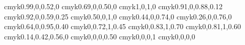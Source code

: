 	\definecolor{JungleGreen}   {cmyk}{0.99,0,0.52,0}
	\definecolor{SeaGreen}      {cmyk}{0.69,0,0.50,0}
	\definecolor{Green}         {cmyk}{1,0,1,0}
	\definecolor{ForestGreen}   {cmyk}{0.91,0,0.88,0.12}
	\definecolor{PineGreen}     {cmyk}{0.92,0,0.59,0.25}
	\definecolor{LimeGreen}     {cmyk}{0.50,0,1,0}
	\definecolor{YellowGreen}   {cmyk}{0.44,0,0.74,0}
	\definecolor{SpringGreen}   {cmyk}{0.26,0,0.76,0}
	\definecolor{OliveGreen}    {cmyk}{0.64,0,0.95,0.40}
	\definecolor{RawSienna}     {cmyk}{0,0.72,1,0.45}
	\definecolor{Sepia}         {cmyk}{0,0.83,1,0.70}
	\definecolor{Brown}         {cmyk}{0,0.81,1,0.60}
	\definecolor{Tan}           {cmyk}{0.14,0.42,0.56,0}
	\definecolor{Gray}          {cmyk}{0,0,0,0.50}
	\definecolor{Black}         {cmyk}{0,0,0,1}
	\definecolor{White}         {cmyk}{0,0,0,0}



\newcommand{\Sb}{\ensuremath{\mathrm{Sb}}}  %
\newcommand{\FLC}{\ensuremath{\mathrm{FL}}} %
\newcommand{\Un}{\ensuremath{\mathrm{Un}}} %

\newcommand{\uBox}{\ensuremath{\mathrm{U}}}


\newcommand{\kint}[1]{\ensuremath{\mbox{int}_{#1}}}
\newcommand{\kin}[1]{\ensuremath{\mbox{in}_{#1}}}
\newcommand{\kout}[1]{\ensuremath{\mbox{out}_{#1}}}
\newcommand{\kinStar}[1]{\ensuremath{{\mbox{in}^\triangleleft_{#1}}}}
\newcommand{\koutStar}[1]{\ensuremath{{\mbox{out}^\triangleleft_{#1}}}}
\newcommand{\keq}[1]{\ensuremath{\mbox{eq}_{#1}}}
\newcommand{\kdeq}[2]{\ensuremath{\mbox{eq}_{#1, #2}}}
\newcommand{\keqDig}[1]{\ensuremath{\mbox{eqDig}_{#1}}}
\newcommand{\kdeqDig}[2]{\ensuremath{\mbox{eqDig}_{#1, #2}}}
\newcommand{\kpred}[1]{\ensuremath{\mbox{pred}_{#1}}}
\newcommand{\kdpred}[2]{\ensuremath{\mbox{pred}_{#1,#2}}}
\newcommand{\kpredDig}[1]{\ensuremath{\mbox{predDig}_{#1}}}
\newcommand{\kdpredDig}[2]{\ensuremath{\mbox{predDig}_{#1,#2}}}
\newcommand{\vertX}{\ensuremath{\mbox{vtx}}}
\newcommand{\kinX}{\ensuremath{\mbox{in}^X}}
\newcommand{\kinY}{\ensuremath{\mbox{in}^Y}}
\newcommand{\towerOrder}[1]{\ensuremath{\mathfrak{t}(#1)}}
\newcommand{\tower}[2]{\ensuremath{\mathfrak{t}(#1,#2)}}
\newcommand{\val}[1]{\ensuremath{\mbox{val}_{#1}}}
\newcommand{\kzero}[1]{\ensuremath{\mbox{zero}_{#1}}}
\newcommand{\ksucc}[1]{\ensuremath{\mbox{succ}\langle #1 \rangle}}

